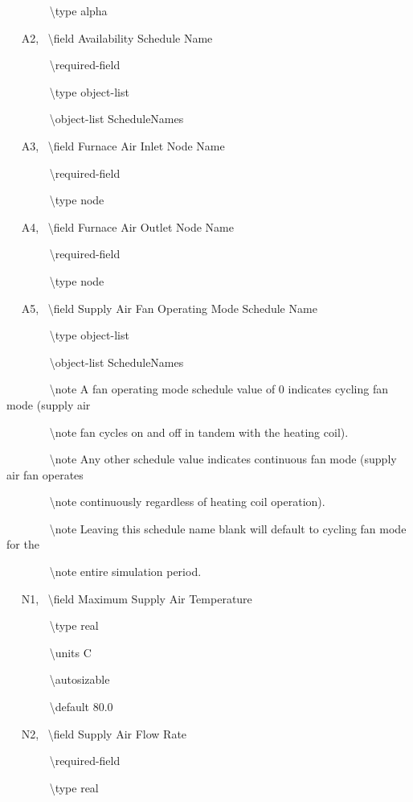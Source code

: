 ~~~~~~~ \textbackslash{}type alpha

~~ A2,~ \textbackslash{}field Availability Schedule Name

~~~~~~~ \textbackslash{}required-field

~~~~~~~ \textbackslash{}type object-list

~~~~~~~ \textbackslash{}object-list ScheduleNames

~~ A3,~ \textbackslash{}field Furnace Air Inlet Node Name

~~~~~~~ \textbackslash{}required-field

~~~~~~~ \textbackslash{}type node

~~ A4,~ \textbackslash{}field Furnace Air Outlet Node Name

~~~~~~~ \textbackslash{}required-field

~~~~~~~ \textbackslash{}type node

~~ A5,~ \textbackslash{}field Supply Air Fan Operating Mode Schedule Name

~~~~~~~ \textbackslash{}type object-list

~~~~~~~ \textbackslash{}object-list ScheduleNames

~~~~~~~ \textbackslash{}note A fan operating mode schedule value of 0 indicates cycling fan mode (supply air

~~~~~~~ \textbackslash{}note fan cycles on and off in tandem with the heating coil).

~~~~~~~ \textbackslash{}note Any other schedule value indicates continuous fan mode (supply air fan operates

~~~~~~~ \textbackslash{}note continuously regardless of heating coil operation).

~~~~~~~ \textbackslash{}note Leaving this schedule name blank will default to cycling fan mode for the

~~~~~~~ \textbackslash{}note entire simulation period.

~~ N1,~ \textbackslash{}field Maximum Supply Air Temperature

~~~~~~~ \textbackslash{}type real

~~~~~~~ \textbackslash{}units C

~~~~~~~ \textbackslash{}autosizable

~~~~~~~ \textbackslash{}default 80.0

~~ N2,~ \textbackslash{}field Supply Air Flow Rate

~~~~~~~ \textbackslash{}required-field

~~~~~~~ \textbackslash{}type real

